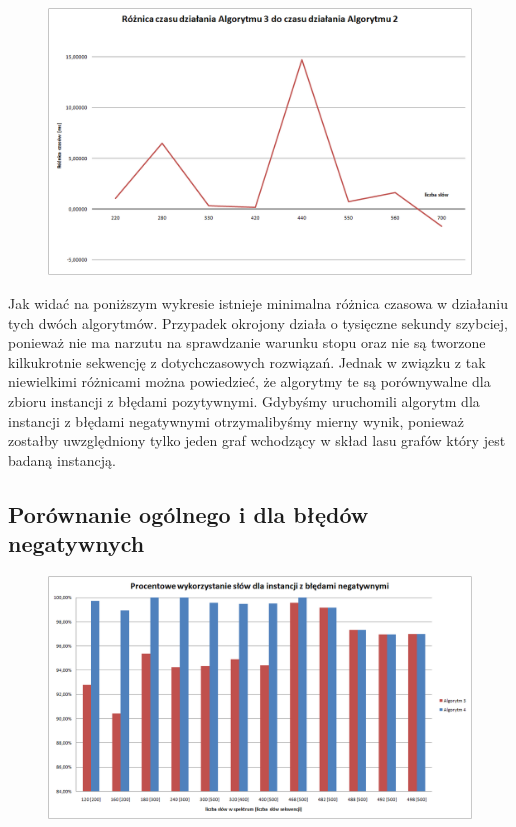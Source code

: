 \documentclass[a4paper,10pt]{article}
\begin{document}
\begin{figure}[h]
  \footnotesize\centering
  \includegraphics[width=\textwidth,keepaspectratio]{timeDiff_general_vs_positive.png}
\end{figure}

Jak widać na poniższym wykresie istnieje minimalna różnica czasowa w działaniu tych dwóch algorytmów. 
Przypadek okrojony działa o tysięczne sekundy szybciej, ponieważ nie ma narzutu na sprawdzanie warunku 
stopu oraz nie są tworzone kilkukrotnie sekwencję z dotychczasowych rozwiązań. Jednak w związku z tak 
niewielkimi różnicami można powiedzieć, że algorytmy te są porównywalne dla zbioru instancji z błędami pozytywnymi.
Gdybyśmy uruchomili algorytm dla instancji z błędami negatywnymi otrzymalibyśmy mierny wynik, ponieważ zostałby 
uwzględniony tylko jeden graf wchodzący w skład lasu grafów który jest badaną instancją.

\subsection{Porównanie ogólnego i dla błędów negatywnych}

\begin{figure}[h]
  \footnotesize\centering
  \includegraphics[width=\textwidth,keepaspectratio]{percentageUsedWords_general_vs_negative.png}
\end{figure}
\end{document}
